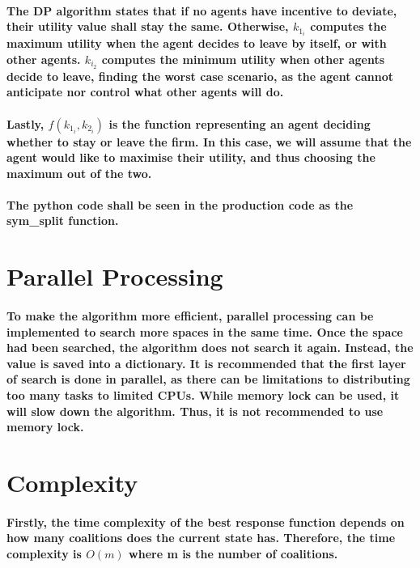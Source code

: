 \documentclass[11pt]{report}
\begin{document}
\paragraph{The DP algorithm states that if no agents have incentive to deviate, their utility value shall stay the same. Otherwise, $k_{1_i}$ computes the maximum utility when the agent decides to leave by itself, or with other agents. $k_{i_2}$ computes the minimum utility when other agents decide to leave, finding the worst case scenario, as the agent cannot anticipate nor control what other agents will do.} 
\paragraph{Lastly, $f(k_{1_i}, k_{2_i})$ is the function representing an agent deciding whether to stay or leave the firm. In this case, we will assume that the agent would like to maximise their utility, and thus choosing the maximum out of the two. }

\paragraph{The python code shall be seen in the production code as the sym\_split function. }
\section{Parallel Processing}
\paragraph{To make the algorithm more efficient, parallel processing can be implemented to search more spaces in the same time. Once the space had been searched, the algorithm does not search it again. Instead, the value is saved into a dictionary. It is recommended that the first layer of search is done in parallel, as there can be limitations to distributing too many tasks to limited CPUs. While memory lock can be used, it will slow down the algorithm. Thus, it is not recommended to use memory lock. }

\section{Complexity}

\paragraph{Firstly, the time complexity of the best response function depends on how many coalitions does the current state has. Therefore, the time complexity is $O(m)$ where m is the number of coalitions. }
\end{document}
